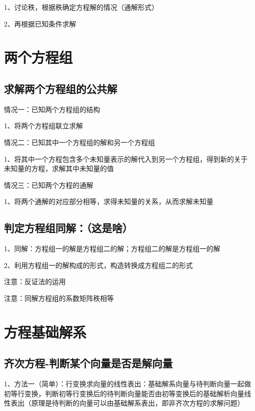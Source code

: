 1、讨论秩，根据秩确定方程解的情况（通解形式）

2、再根据已知条件求解

\section{两个方程组}



\subsection{求解两个方程组的公共解}

情况一：已知两个方程组的结构

1、将两个方程组联立求解

情况二：已知其中一个方程组的解和另一个方程组

1、将其中一个方程包含多个未知量表示的解代入到另一个方程组，得到新的关于未知量的方程，求解其中未知量的值

情况三：已知两个方程的通解

1、将两个通解的对应部分相等，求得未知量的关系，从而求解未知量



\subsection{判定方程组同解：（这是啥）}

1、同解：方程组一的解是方程组二的解；方程组二的解是方程组一的解

2、利用方程组一的解构成的形式，构造转换成方程组二的形式

注意：反证法的运用

注意：同解方程组的系数矩阵秩相等



\section{方程基础解系}



\subsection{齐次方程-判断某个向量是否是解向量}

1、方法一（简单）：行变换求向量的线性表出：基础解系向量与待判断向量一起做初等行变换，判断初等行变换后的待判断向量能否由初等变换后的基础解析向量线性表出（原理是待判断的向量可以由基础解系表出，即非齐次方程的求解问题）

